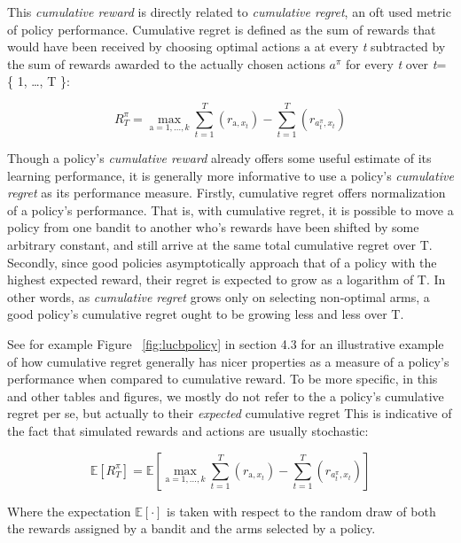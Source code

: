 \documentclass[nojss]{jss}\usepackage[]{graphicx}\usepackage[]{color}
\begin{document}
This \textit{cumulative reward} is directly related to \textit{cumulative regret}, an oft used metric of policy performance. Cumulative regret is defined as the sum of rewards that would have been received by choosing optimal actions $\mathrm{a}$ at every \emph{t} subtracted by the sum of rewards awarded to the actually chosen actions $a^{\pi}$ for every \emph{t} over \emph{t}= \{ 1, \ldots, T \}:

\begin{equation} \label{eq:2}
R^{\pi}_{T} = \max_{\mathrm{a} = 1, \dots, k} \sum^{T}_{t=1}(r_{\mathrm{a},x_t}) - \sum^{T}_{t=1}(r_{a^{\pi}_t,x_t})
\end{equation}

Though a policy's \textit{cumulative reward} already offers some useful estimate of its learning performance, it is generally more informative to use a policy's \textit{cumulative regret} as its performance measure. Firstly, cumulative regret offers normalization of a policy's performance. That is, with cumulative regret, it is possible to move a policy from one bandit to another who's rewards have been shifted by some arbitrary constant, and still arrive at the same total cumulative regret over T. Secondly, since good policies asymptotically approach that of a policy with the highest expected reward, their regret is expected to grow as a logarithm of T. In other words, as \textit{cumulative regret} grows only on selecting non-optimal arms, a good policy's cumulative regret ought to be growing less and less over T.

See for example Figure ~\ref{fig:lucbpolicy} in section 4.3 for an illustrative example of how cumulative regret generally has nicer properties as a measure of a policy's performance when compared to cumulative reward. To be more specific, in this and other tables and figures, we mostly do not refer to the a policy's cumulative regret per se, but actually to their \textit{expected} cumulative regret This is indicative of the fact that simulated rewards and actions are usually stochastic:

\begin{equation} \label{eq:3}
\mathbb{E}\left[R^{\pi}_{T} \right] = \mathbb{E}\left[  \max_{\mathrm{a} = 1, \dots, k} \sum^{T}_{t=1}(r_{\mathrm{a},x_t}) - \sum^{T}_{t=1}(r_{a^{\pi}_t,x_t})\right]
\end{equation}

Where the expectation $\mathbb{E}\left[ \mathord{\cdot}\right]$ is taken with respect to the random draw of both the rewards assigned by a bandit and the arms selected by a policy.
\end{document}
